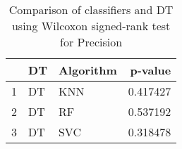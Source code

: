 \begin{table}
\footnotesize
\caption{Comparison of classifiers and DT using Wilcoxon signed-rank test for Precision}
\label{tab:DT wilcoxon Precision comparison}
\begin{tabular}{lllr}
\hline
 & DT & Algorithm & p-value \\
\hline
1 & DT & KNN & 0.417427 \\
2 & DT & RF & 0.537192 \\
3 & DT & SVC & 0.318478 \\
\hline
\end{tabular}
\end{table}
